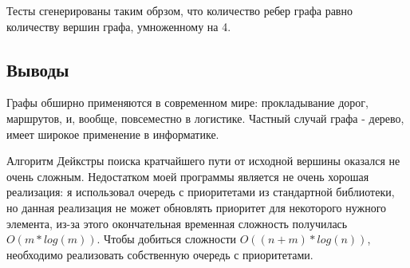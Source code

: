 \documentclass[12pt]{article}
\begin{document}
Тесты сгенерированы таким обрзом, что количество ребер графа равно количеству вершин графа, умноженному на 4.


\subsection*{Выводы}

Графы обширно применяются в современном мире: прокладывание дорог, маршрутов, и, вообще, повсеместно в логистике. Частный случай графа - дерево, имеет широкое применение в информатике. 

Алгоритм Дейкстры поиска кратчайшего пути от исходной вершины оказался не очень сложным. Недостатком моей программы является не очень хорошая реализация: я использовал очередь с приоритетами из стандартной библиотеки, но данная реализация не может обновлять приоритет для некоторого нужного элемента, из-за этого окончательная временная сложность получилась $O(m * log(m))$. Чтобы добиться сложности $O((n + m) * log(n))$, необходимо реализовать собственную очередь с приоритетами.
\end{document}
